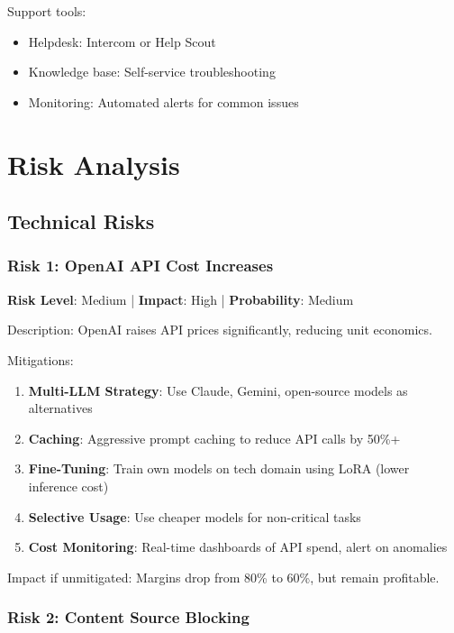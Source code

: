 \documentclass{report}
\begin{document}
Support tools:
\begin{itemize}
    \item Helpdesk: Intercom or Help Scout
    \item Knowledge base: Self-service troubleshooting
    \item Monitoring: Automated alerts for common issues
\end{itemize}

\newpage

\chapter{Risk Analysis}

\section{Technical Risks}

\subsection{Risk 1: OpenAI API Cost Increases}

\textbf{Risk Level}: Medium | \textbf{Impact}: High | \textbf{Probability}: Medium

Description: OpenAI raises API prices significantly, reducing unit economics.

Mitigations:
\begin{enumerate}
    \item \textbf{Multi-LLM Strategy}: Use Claude, Gemini, open-source models as alternatives
    \item \textbf{Caching}: Aggressive prompt caching to reduce API calls by 50\%+
    \item \textbf{Fine-Tuning}: Train own models on tech domain using LoRA (lower inference cost)
    \item \textbf{Selective Usage}: Use cheaper models for non-critical tasks
    \item \textbf{Cost Monitoring}: Real-time dashboards of API spend, alert on anomalies
\end{enumerate}

Impact if unmitigated: Margins drop from 80\% to 60\%, but remain profitable.

\subsection{Risk 2: Content Source Blocking}
\end{document}
